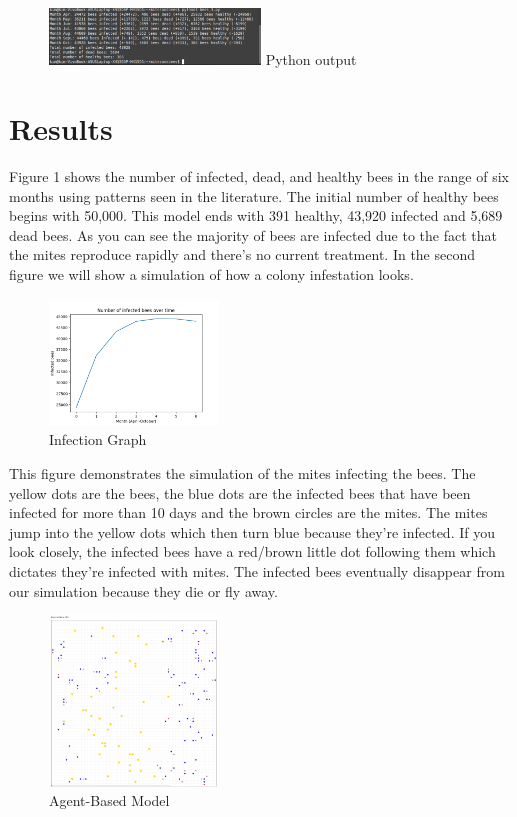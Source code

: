 \documentclass[final,5p,times,twocolumn,authoryear]{elsarticle}
\begin{document}
\begin{figure}
  \centering
  \includegraphics[width=0.5\textwidth, angle=360]{bees_output.png}
  Python output
\end{figure}

\section{Results}
\label{Results}
Figure 1 shows the number of infected, dead, and healthy bees in the range of six months using patterns seen in the literature. The initial number of healthy bees begins with 50,000. This model ends with 391 healthy, 43,920 infected and 5,689 dead bees. As you can see the majority of bees are infected due to the fact that the mites reproduce rapidly and there’s no current treatment. In the second figure we will show a simulation of how a colony infestation looks. 

\begin{figure}
  \centering
  \includegraphics[width=0.4\textwidth, angle=360]{Figure_2.png}
  \caption{Infection Graph}
\end{figure}

This figure demonstrates the simulation of the mites infecting the bees. The yellow dots are the bees, the blue dots are the infected bees that have been infected for more than 10 days and the brown circles are the mites. The mites jump into the yellow dots which then turn blue because they’re infected. If you look closely, the infected bees have a red/brown little dot following them which dictates they’re infected with mites. The infected bees eventually disappear from our simulation because they die or fly away.

\begin{figure}
  \centering
  \includegraphics[width=0.4\textwidth, angle=360]{bees_model_pic.png}
  \caption{Agent-Based Model}
\end{figure}
\end{document}
